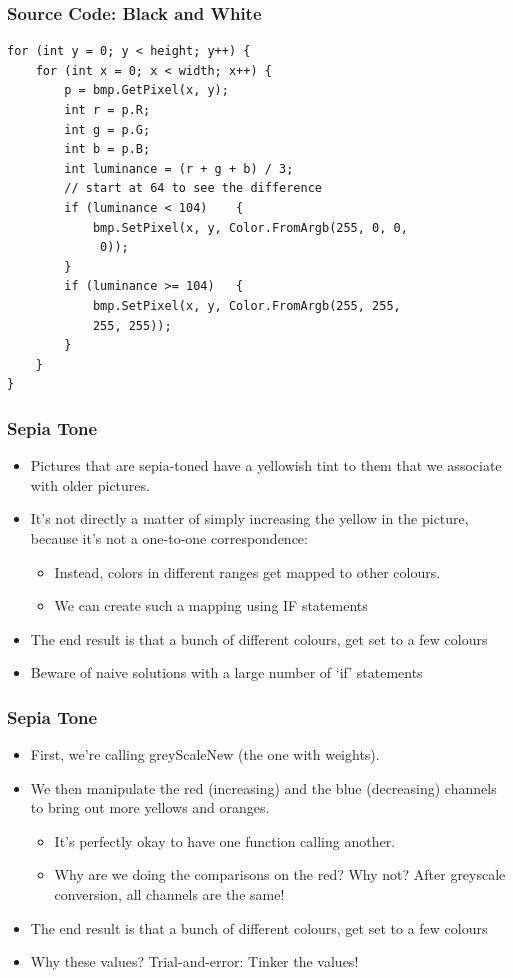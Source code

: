 \begin{frame}[fragile]
	\frametitle{Source Code: Black and White}
	
\begin{lstlisting}
for (int y = 0; y < height; y++) {
	for (int x = 0; x < width; x++)	{
		p = bmp.GetPixel(x, y);
		int r = p.R;
		int g = p.G;
		int b = p.B;
		int luminance = (r + g + b) / 3;
		// start at 64 to see the difference
		if (luminance < 104)	{
			bmp.SetPixel(x, y, Color.FromArgb(255, 0, 0,
			 0));
		}
		if (luminance >= 104)	{
		 	bmp.SetPixel(x, y, Color.FromArgb(255, 255, 
		 	255, 255));
		}
	}
}
\end{lstlisting}

\end{frame}

\begin{frame}
	\frametitle{Sepia Tone}
	
	\begin{itemize}		
		\item Pictures that are sepia-toned have a yellowish tint to them that we associate with older pictures.
		\item It's not directly a matter of simply increasing the yellow in the picture, because it's not a one-to-one correspondence:
		\begin{itemize}
			\item Instead, colors in different ranges get mapped to other colours.
			\item We can create such a mapping using IF statements
		\end{itemize}	
		\item The end result is that a bunch of different colours, get set to a few colours
		\item Beware of naive solutions with a large number of `if' statements
	\end{itemize}
\end{frame}



\begin{frame}
	\frametitle{Sepia Tone}
	
	\begin{itemize}		
		\item First, we're calling greyScaleNew (the one with weights).
		\item We then manipulate the red (increasing) and the blue (decreasing) channels to bring out more yellows and oranges.
		\begin{itemize}
			\item It's perfectly okay to have one function calling another.
			\item Why are we doing the comparisons on the red? Why not?  After greyscale conversion, all channels are the same!
		\end{itemize}	
		\item The end result is that a bunch of different colours, get set to a few colours
		\item Why these values? Trial-and-error: Tinker the values!

	\end{itemize}
\end{frame}

